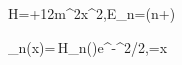 H=+\frac12m\omega^2x^2,\qquad E_n=\hbar\omega\left(n+\right)

\psi_n(x)=\,H_n(\xi)e^{-\xi^2/2},\qquad \xi=x
